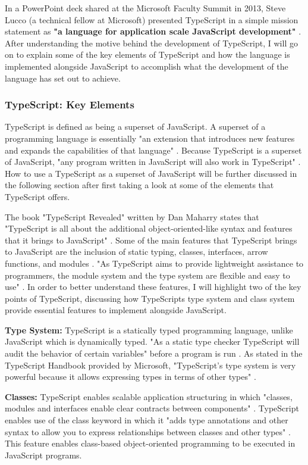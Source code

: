 \documentclass{article}
\theoremstyle{theorem}
\theoremstyle{definition}
\theoremstyle{remark}
\begin{document}
In a PowerPoint deck shared at the Microsoft Faculty Summit in 2013, Steve Lucco (a technical fellow at Microsoft) presented TypeScript in a simple mission statement as \textbf{"a language for application scale JavaScript development"} \cite{13}. After understanding the motive behind the development of TypeScript, I will go on to explain some of the key elements of TypeScript and how the language is implemented alongside JavaScript to accomplish what the development of the language has set out to achieve.



\subsubsection{TypeScript: Key Elements}

TypeScript is defined as being a superset of JavaScript. A superset of a programming language is essentially "an extension that introduces new features and expands the capabilities of that language" \cite{14}. Because TypeScript is a superset of JavaScript, "any program written in JavaScript will also work in TypeScript" \cite{14}. How to use a TypeScript as a superset of JavaScript will be further discussed in the following section after first taking a look at some of the elements that TypeScript offers.

The book "TypeScript Revealed" written by Dan Maharry states that "TypeScript is all about the additional object-oriented-like syntax and features that it brings to JavaScript" \cite{10}. Some of the main features that TypeScript brings to JavaScript are the inclusion of static typing, classes, interfaces, arrow functions, and modules \cite{10}. "As TypeScript aims to provide lightweight assistance to programmers, the module system and the type system are flexible and easy to use" \cite{3}. In order to better understand these features, I will highlight two of the key points of TypeScript, discussing how TypeScripts type system and class system provide essential features to implement alongside JavaScript.

\textbf{Type System:}
TypeScript is a statically typed programming language, unlike JavaScript which is dynamically typed. "As a static type checker TypeScript will audit the behavior of certain variables" before a program is run \cite{14}. As stated in the TypeScript Handbook provided by Microsoft, "TypeScript’s type system is very powerful because it allows expressing types in terms of other types" \cite{11}.

\textbf{Classes:}
TypeScript enables scalable application structuring in which "classes, modules and interfaces enable clear contracts between components" \cite{13}. TypeScript enables use of the class keyword in which it "adds type annotations and other syntax to allow you to express relationships between classes and other types" \cite{11}. This feature enables class-based object-oriented programming to be executed in JavaScript programs.
\end{document}
